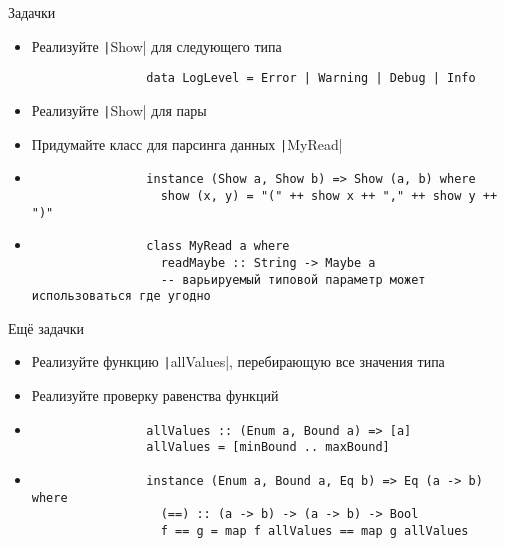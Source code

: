     \begin{frame}[fragile]{Задачки}
        \begin{itemize}
            \item[\todo] Реализуйте \texttt|Show| для следующего типа
            \begin{verbatim}
                data LogLevel = Error | Warning | Debug | Info
            \end{verbatim}
            \item[\todo] Реализуйте \texttt|Show| для пары
            \item[\todo] Придумайте класс для парсинга данных \texttt|MyRead|
            \item[\answer] \pause
            \begin{verbatim}
                instance (Show a, Show b) => Show (a, b) where
                  show (x, y) = "(" ++ show x ++ "," ++ show y ++ ")"
            \end{verbatim}
            \item[\answer] \pause
            \begin{verbatim}
                class MyRead a where
                  readMaybe :: String -> Maybe a
                  -- варьируемый типовой параметр может использоваться где угодно
            \end{verbatim}
        \end{itemize}
    \end{frame}

    \begin{frame}[fragile]{Ещё задачки}
        \begin{itemize}
            \item[\todo] Реализуйте функцию \texttt|allValues|, перебирающую все значения типа
            \item[\todo] Реализуйте проверку равенства функций
            \item[\answer] \pause
            \begin{verbatim}
                allValues :: (Enum a, Bound a) => [a]
                allValues = [minBound .. maxBound]
            \end{verbatim}
            \item[\answer] \pause
            \begin{verbatim}
                instance (Enum a, Bound a, Eq b) => Eq (a -> b) where
                  (==) :: (a -> b) -> (a -> b) -> Bool
                  f == g = map f allValues == map g allValues
            \end{verbatim}
        \end{itemize}
    \end{frame}

